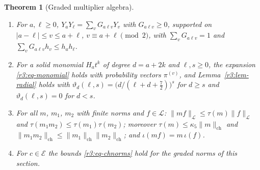 \documentclass[11pt]{amsart}
\newtheorem{theorem}{Theorem}[section]
\theoremstyle{definition}
\theoremstyle{remark}
\numberwithin{equation}{section}
\newcommand{\nrm}[1]{\lVert #1\rVert}
\begin{document}
\begin{theorem}[Graded multiplier algebra]\label{r5:thm-mult}
\begin{enumerate}[label=\textup{(\alph*)}]
\item For $a,\ell\geq0$, $Y_aY_\ell=\sum_vG_{a\ell v}Y_v$ with $G_{a\ell v}\geq0$, supported on $|a-\ell|\leq v\leq a+\ell$, $v\equiv a+\ell\pmod2$, with $\sum_vG_{a\ell v}=1$ and $\sum_vG_{a\ell v}h_v\leq h_ah_\ell$.
\item For a solid monomial $H_at^k$ of degree $d=a+2k$ and $\ell,s\geq0$, the expansion \eqref{r3:eq-monomial} holds with probability vectors $\pi^{(v)}$, and Lemma~\ref{r3:lem-radial} holds with $\vartheta_d(\ell,s)=\big(d/(\ell+d+\frac72)\big)^s$ for $d\geq s$ and $\vartheta_d(\ell,s)=0$ for $d<s$.
\item For all $m$, $m_1$, $m_2$ with finite norms and $f\in\mathcal L$: $\nrm{mf}_{\mathcal L}\leq\tau(m)\nrm f_{\mathcal L}$ and $\tau(m_1m_2)\leq\tau(m_1)\tau(m_2)$; moreover $\tau(m)\leq\kappa_5\nrm m_{\mathrm{ch}}$ and $\nrm{m_1m_2}_{\mathrm{ch}}\leq\nrm{m_1}_{\mathrm{ch}}\nrm{m_2}_{\mathrm{ch}}$; and $\iota(mf)=m\,\iota(f)$.
\item For $c\in\mathcal E$ the bounds \eqref{r3:eq-chnorms} hold for the graded norms of this section.
\end{enumerate}
\end{theorem}
\end{document}
